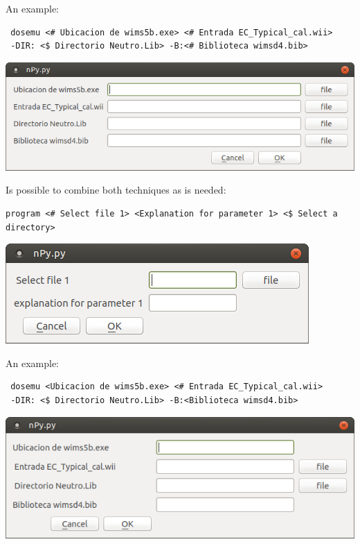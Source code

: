 \documentclass[a4paper,10pt]{article}
\begin{document}
\noindent An example:

\begin{verbatim}
 dosemu <# Ubicacion de wims5b.exe> <# Entrada EC_Typical_cal.wii> 
 -DIR: <$ Directorio Neutro.Lib> -B:<# Biblioteca wimsd4.bib>
 \end{verbatim}

\begin{center}
 \includegraphics[width=\textwidth]{img/contextMenuFile.png}
\end{center}

\noindent Is possible to combine both techniques as is needed:

\begin{verbatim}
program <# Select file 1> <Explanation for parameter 1> <$ Select a directory>
 \end{verbatim}

 \begin{center}
 \includegraphics[width=\textwidth]{img/contextMenuExampleCombined.png}
\end{center}

\noindent An example:

\begin{verbatim}
 dosemu <Ubicacion de wims5b.exe> <# Entrada EC_Typical_cal.wii> 
 -DIR: <$ Directorio Neutro.Lib> -B:<Biblioteca wimsd4.bib>
 \end{verbatim}

\begin{center}
 \includegraphics[width=\textwidth]{img/contextMenuCombined.png}
\end{center}
\end{document}
